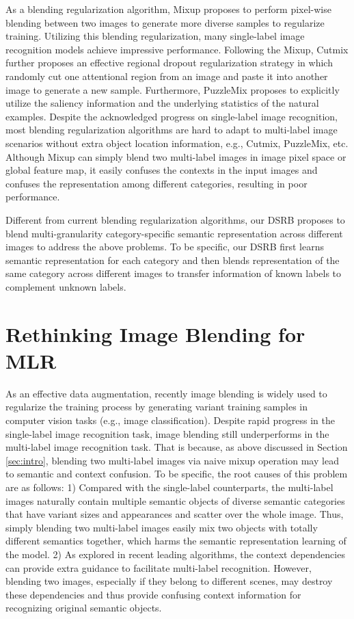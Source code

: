 \documentclass[lettersize,journal]{IEEEtran}
\begin{document}
As a blending regularization algorithm, Mixup \cite{Zhang2017Mixup} proposes to perform pixel-wise blending between two images to generate more diverse samples to regularize training. Utilizing this blending regularization, many single-label image recognition models achieve impressive performance. Following the Mixup, Cutmix \cite{Yun2019Cutmix} further proposes an effective regional dropout regularization strategy in which randomly cut one attentional region from an image and paste it into another image to generate a new sample. Furthermore, PuzzleMix \cite{Kim2020Puzzlemix} proposes to explicitly utilize the saliency information and the underlying statistics of the natural examples. Despite the acknowledged progress on single-label image recognition, most blending regularization algorithms are hard to adapt to multi-label image scenarios without extra object location information, e.g., Cutmix, PuzzleMix, etc. Although Mixup can simply blend two multi-label images in image pixel space or global feature map, it easily confuses the contexts in the input images and confuses the representation among different categories, resulting in poor performance.

Different from current blending regularization algorithms, our DSRB proposes to blend multi-granularity category-specific semantic representation across different images to address the above problems. To be specific, our DSRB first learns semantic representation for each category and then blends representation of the same category across different images to transfer information of known labels to complement unknown labels.  

\section{Rethinking Image Blending for MLR} \label{sec:rethinking}
As an effective data augmentation, recently image blending \cite{Zhang2017Mixup, Yun2019Cutmix, gao2022dynamic_mixup, Chang2020Mixup-cam} is widely used to regularize the training process by generating variant training samples in computer vision tasks (e.g., image classification). Despite rapid progress in the single-label image recognition task, image blending still underperforms in the multi-label image recognition task. That is because, as above discussed in Section \ref{sec:intro}, blending two multi-label images via naive mixup operation \cite{Zhang2017Mixup} may lead to semantic and context confusion. To be specific, the root causes of this problem are as follows: 1) Compared with the single-label counterparts, the multi-label images naturally contain multiple semantic objects of diverse semantic categories that have variant sizes and appearances and scatter over the whole image. Thus, simply blending two multi-label images easily mix two objects with totally different semantics together, which harms the semantic representation learning of the model. 2) As explored in recent leading algorithms, the context dependencies can provide extra guidance to facilitate multi-label recognition. However, blending two images, especially if they belong to different scenes, may destroy these dependencies and thus provide confusing context information for recognizing original semantic objects. 
\end{document}
